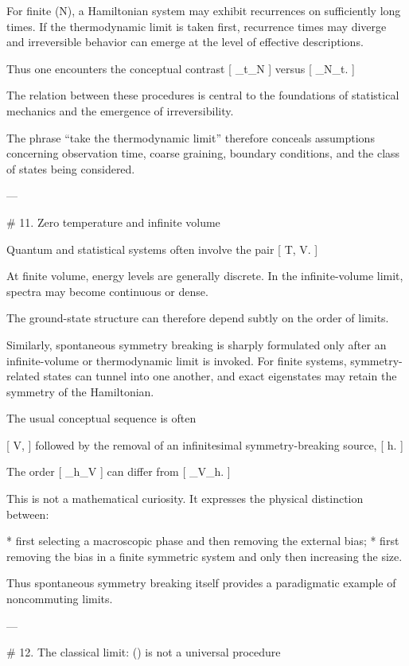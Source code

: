 For finite (N), a Hamiltonian system may exhibit recurrences on sufficiently long times. If the thermodynamic limit is taken first, recurrence times may diverge and irreversible behavior can emerge at the level of effective descriptions.

Thus one encounters the conceptual contrast
[
\lim_{t\to\infty}\lim_{N\to\infty}
]
versus
[
\lim_{N\to\infty}\lim_{t\to\infty}.
]

The relation between these procedures is central to the foundations of statistical mechanics and the emergence of irreversibility.

The phrase ``take the thermodynamic limit'' therefore conceals assumptions concerning observation time, coarse graining, boundary conditions, and the class of states being considered.

---

# 11. Zero temperature and infinite volume

Quantum and statistical systems often involve the pair
[
T,
\qquad
V\rightarrow\infty.
]

At finite volume, energy levels are generally discrete. In the infinite-volume limit, spectra may become continuous or dense.

The ground-state structure can therefore depend subtly on the order of limits.

Similarly, spontaneous symmetry breaking is sharply formulated only after an infinite-volume or thermodynamic limit is invoked. For finite systems, symmetry-related states can tunnel into one another, and exact eigenstates may retain the symmetry of the Hamiltonian.

The usual conceptual sequence is often

[
V\rightarrow\infty,
]
followed by the removal of an infinitesimal symmetry-breaking source,
[
h.
]

The order
[
\lim_{h}\lim_{V\to\infty}
]
can differ from
[
\lim_{V\to\infty}\lim_{h}.
]

This is not a mathematical curiosity. It expresses the physical distinction between:

* first selecting a macroscopic phase and then removing the external bias;
* first removing the bias in a finite symmetric system and only then increasing the size.

Thus spontaneous symmetry breaking itself provides a paradigmatic example of noncommuting limits.

---

# 12. The classical limit: (\hbar{}) is not a universal procedure

